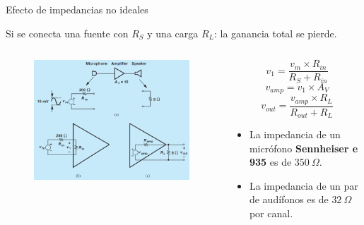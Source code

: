 \documentclass[t,aspectratio=169]{beamer}
\begin{document}
\begin{frame}{Efecto de impedancias no ideales}

Si se conecta una fuente con $R_S$ y una carga $R_L$: la ganancia total se pierde.
%
\begin{columns}
\begin{column}{0.55\textwidth}
%
\begin{figure}[H]
    \centering
    \includegraphics[width=\textwidth]{figuras/amplificador_impedancias.png}
\end{figure}

\end{column}
\begin{column}{0.45\textwidth}

\[ v_1 = \dfrac{v_m \times R_{in}}{R_S + R_{in}} \]
\[ v_{amp} = v_1 \times A_V \]
\[ v_{out} = \dfrac{v_{amp} \times R_L}{R_{out} + R_L} \]

\begin{itemize}
    \item La impedancia de un micrófono \textbf{Sennheiser e 935} es de $350\ \Omega$.
    \item La impedancia de un par de audífonos es de $32\ \Omega$ por canal.
\end{itemize}
\end{column}
\end{columns}
    
\end{frame}
\end{document}
